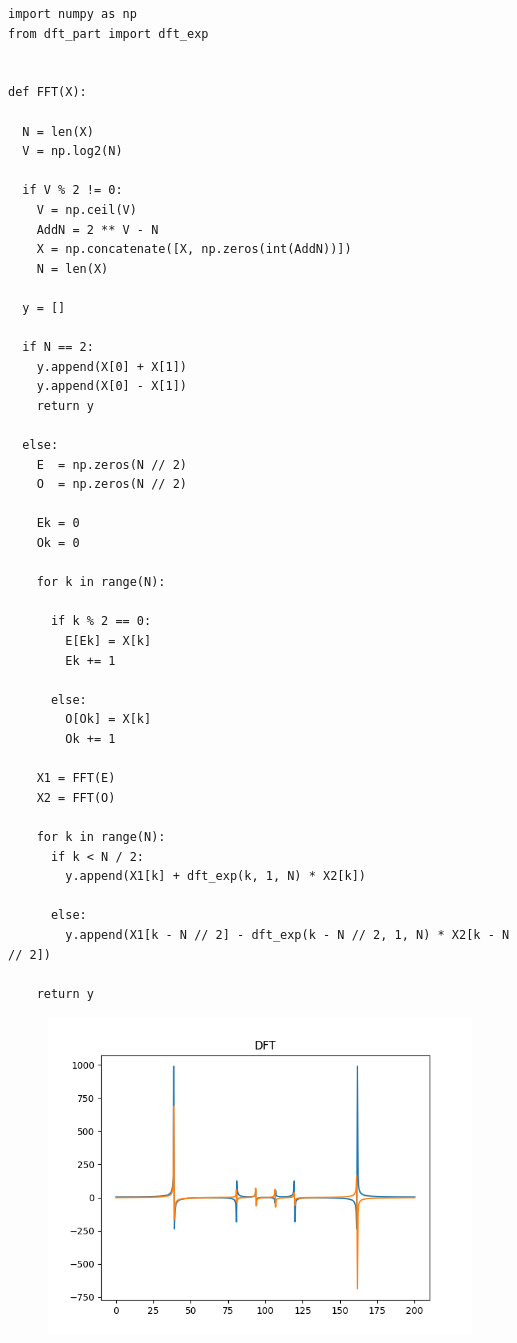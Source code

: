 \documentclass[12pt]{article}
\begin{document}
\begin{lstlisting}
import numpy as np
from dft_part import dft_exp


def FFT(X):

  N = len(X)
  V = np.log2(N)

  if V % 2 != 0:
    V = np.ceil(V)
    AddN = 2 ** V - N
    X = np.concatenate([X, np.zeros(int(AddN))])
    N = len(X)

  y = []

  if N == 2:
    y.append(X[0] + X[1])
    y.append(X[0] - X[1])
    return y
  
  else:
    E  = np.zeros(N // 2)
    O  = np.zeros(N // 2)

    Ek = 0
    Ok = 0

    for k in range(N):

      if k % 2 == 0:
        E[Ek] = X[k]
        Ek += 1

      else:
        O[Ok] = X[k]
        Ok += 1

    X1 = FFT(E)
    X2 = FFT(O)

    for k in range(N):
      if k < N / 2:
        y.append(X1[k] + dft_exp(k, 1, N) * X2[k])
      
      else:
        y.append(X1[k - N // 2] - dft_exp(k - N // 2, 1, N) * X2[k - N // 2])

    return y
\end{lstlisting}

\begin{figure}[!htb]
\centering
\includegraphics[scale=1.00]{dft.png}
\caption{}
\label{}


\end{figure}
\end{document}
